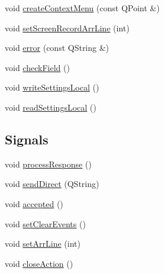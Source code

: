 \begin{DoxyCompactItemize}
\item 
void \hyperlink{classFglForm_af07f7257121ab71b9a53ccb2fd1a9fe3}{createContextMenu} (const QPoint \&)
\item 
void \hyperlink{classFglForm_afce8d989187c85d7bde751824a9b6c6a}{setScreenRecordArrLine} (int)
\item 
void \hyperlink{classFglForm_a3d2c6f2a3a0e1828ff1f43d4d93fa775}{error} (const QString \&)
\item 
void \hyperlink{classFglForm_a95fd29ee66dc40bb56d6bb94593feddd}{checkField} ()
\item 
void \hyperlink{classFglForm_a4fdd15cf1295a7d04b378e5c4cb2d877}{writeSettingsLocal} ()
\item 
void \hyperlink{classFglForm_ae9f393760ac910dd86de0919be07f41c}{readSettingsLocal} ()
\end{DoxyCompactItemize}
\subsection*{Signals}
\begin{DoxyCompactItemize}
\item 
void \hyperlink{classFglForm_a797f5a3e960a73a6fff9a1bb74059956}{processResponse} ()
\item 
void \hyperlink{classFglForm_ab8e58a4d027770ba170972d247b617dd}{sendDirect} (QString)
\item 
void \hyperlink{classFglForm_a1e972cdb1514dcb3c6613d123beb8f6a}{accepted} ()
\item 
void \hyperlink{classFglForm_a9c7de4f0bd6f44e3103df2e81a504974}{setClearEvents} ()
\item 
void \hyperlink{classFglForm_a7bef8f5a9e151e3b09d9de652b78ec92}{setArrLine} (int)
\item 
void \hyperlink{classFglForm_a6084470ee7bb46645d64a82503c60fba}{closeAction} ()
\end{DoxyCompactItemize}
